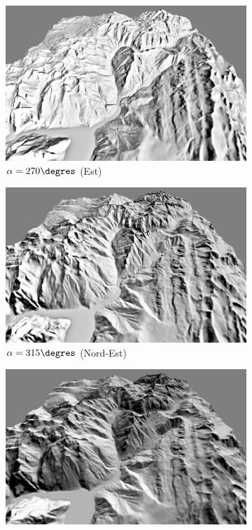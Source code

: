 \begin{figure}[h!]
 \begin{subfigure}[t]{0.24\linewidth}
   \centering
   \includegraphics[width=1.0\linewidth]{Resultats/2_est_our.png}
   \caption{$\alpha = 270\degres$ (Est)}
 \end{subfigure}
 \begin{subfigure}[t]{0.24\linewidth}
   \centering
   \includegraphics[width=1.0\linewidth]{Resultats/2_nordest_our.png}
   \caption{$\alpha = 315\degres$ (Nord-Est)}
 \end{subfigure}
  \begin{subfigure}[t]{0.24\linewidth}
   \centering
   \includegraphics[width=1.0\linewidth]{Resultats/2_nord_lambert.png}

\end{subfigure}
\end{figure}
